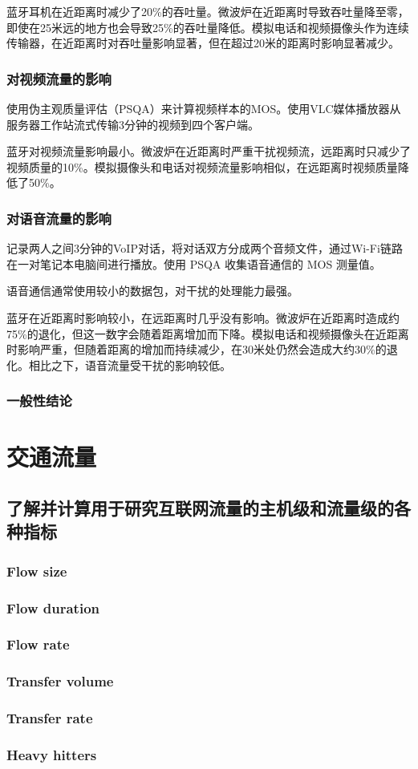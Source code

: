 蓝牙耳机在近距离时减少了20\%的吞吐量。微波炉在近距离时导致吞吐量降至零，即使在25米远的地方也会导致25\%的吞吐量降低。模拟电话和视频摄像头作为连续传输器，在近距离时对吞吐量影响显著，但在超过20米的距离时影响显著减少。

\subsection{对视频流量的影响}

使用伪主观质量评估（PSQA）来计算视频样本的MOS。使用VLC媒体播放器从服务器工作站流式传输3分钟的视频到四个客户端。

蓝牙对视频流量影响最小。微波炉在近距离时严重干扰视频流，远距离时只减少了视频质量的10\%。模拟摄像头和电话对视频流量影响相似，在远距离时视频质量降低了50\%。

\subsection{对语音流量的影响}

记录两人之间3分钟的VoIP对话，将对话双方分成两个音频文件，通过Wi-Fi链路在一对笔记本电脑间进行播放。使用 PSQA 收集语音通信的 MOS 测量值。

语音通信通常使用较小的数据包，对干扰的处理能力最强。

蓝牙在近距离时影响较小，在远距离时几乎没有影响。微波炉在近距离时造成约75\%的退化，但这一数字会随着距离增加而下降。模拟电话和视频摄像头在近距离时影响严重，但随着距离的增加而持续减少，在30米处仍然会造成大约30\%的退化。相比之下，语音流量受干扰的影响较低。

\subsection{一般性结论}



\chapter{交通流量}

\section{了解并计算用于研究互联网流量的主机级和流量级的各种指标}

\subsection{Flow size}
\subsection{Flow duration}
\subsection{Flow rate}
\subsection{Transfer volume}
\subsection{Transfer rate}
\subsection{Heavy hitters}

